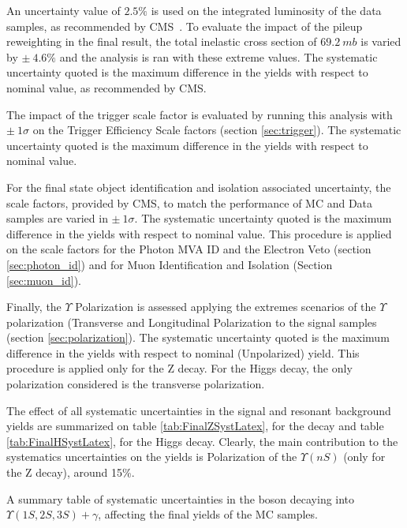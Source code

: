An uncertainty value of $2.5\%$ is used on the integrated luminosity of the data samples, as recommended by CMS~\cite{CMS-PAS-LUM-17-001}. To evaluate the impact of the pileup reweighting in the final result, the total inelastic cross section of $69.2~mb$ is varied by $\pm~4.6\%$ and the analysis is ran with these extreme values. The systematic uncertainty quoted is the maximum difference in the yields with respect to nominal value, as recommended by CMS. 

The impact of the trigger scale factor is evaluated by running this analysis with $\pm~1\sigma$ on the Trigger Efficiency Scale factors (section \ref{sec:trigger}). The systematic uncertainty quoted is the maximum difference in the yields with respect to nominal value.

For the final state object identification and isolation associated uncertainty, the scale factors, provided by CMS, to match the performance of MC and Data samples are varied in  $\pm~1\sigma$. The systematic uncertainty quoted is the maximum difference in the yields with respect to nominal value. This procedure is applied on the scale factors for the Photon MVA ID and the Electron Veto (section \ref{sec:photon_id}) and for Muon Identification and Isolation (Section \ref{sec:muon_id}). 

Finally, the $\Upsilon$ Polarization is assessed applying the extremes scenarios of the $\Upsilon$ polarization (Transverse and Longitudinal Polarization to the signal samples (section \ref{sec:polarization}). The systematic uncertainty quoted is the maximum difference in the yields with respect to nominal (Unpolarized) yield. This procedure is applied only for the Z decay. For the Higgs decay, the only polarization considered is the transverse polarization.

The effect of all systematic uncertainties in the signal and resonant background yields are summarized on table \ref{tab:FinalZSystLatex}, for the \Z decay and table \ref{tab:FinalHSystLatex}, for the Higgs decay. Clearly, the main contribution to the systematics uncertainties on the yields is Polarization of the $\Upsilon(nS)$ (only for the Z decay), around 15\%.

\begin{table}[ht]
  \begin{center}
    \caption{ A summary table of systematic uncertainties in the \Z boson decaying into $\Upsilon(1S,2S,3S) + \gamma$, affecting the final yields of the MC samples.}
    
    \label{tab:FinalZSystLatex}
  \end{center}
\end{table}


